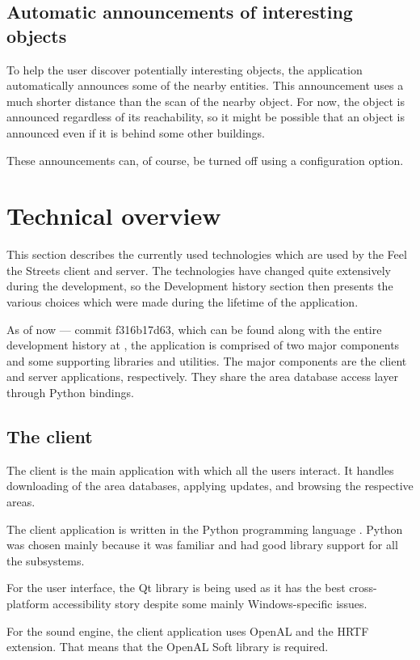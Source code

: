 \documentclass[nolof,digital]{fithesis3}
\begin{document}
\subsection{Automatic announcements of interesting objects}
To help the user discover potentially interesting objects, the application automatically announces some of the nearby entities. This announcement uses a much shorter distance than the scan of the nearby object. For now, the object is announced regardless of its reachability, so it might be possible that an object is announced even if it is behind some other buildings.

These announcements can, of course, be turned off using a configuration option.
\section{Technical overview}
This section describes the currently used technologies which are used by the Feel the Streets client and server. The technologies have changed quite extensively during the development, so the Development history section then presents the various choices which were made during the lifetime of the application.

As of now --- commit f316b17d63, which can be found along with the entire development history at \parencite{fts_repo}, the application is comprised of two major components and some supporting libraries and utilities. The major components are the client and server applications, respectively. They share the area database access layer through Python bindings.
\subsection{The client}
The client is the main application with which all the users interact. It handles downloading of the area databases, applying updates, and browsing the respective areas.

The client application is written in the Python programming language \parencite{python}. Python was chosen mainly because it was familiar and had good library support for all the subsystems.

For the user interface, the Qt library \parencite{qt} is being used as it has the best cross-platform accessibility story despite some mainly Windows-specific issues.

For the sound engine, the client application uses OpenAL and the HRTF extension. That means that the OpenAL Soft library \parencite{openalsoft} is required.
\end{document}
